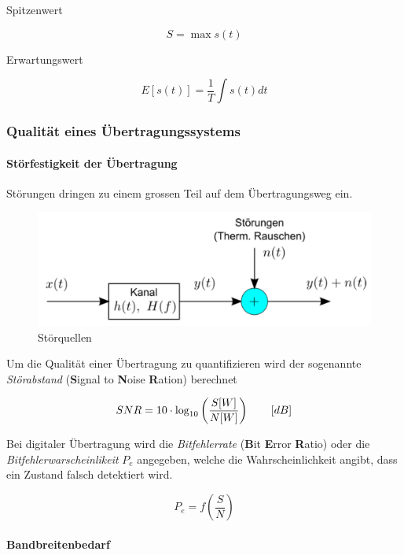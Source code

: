 \documentclass[
  10pt,
  a4paper,
  german]{article}
\let\oldparagraph\paragraph
\renewcommand{\paragraph}[1]{\oldparagraph{#1}\mbox{}}
\numberwithin{equation}{section}
\let\paragraph\oldparagraph
\renewcommand{\paragraph}[1]{\oldparagraph{#1}\mbox{}\par}
\begin{document}
Spitzenwert

\[
S = \max{s(t)}
\]

Erwartungswert

\[
E[s(t)]=\frac{1}{T}\int{s(t)dt}
\]

\hypertarget{qualituxe4t-eines-uxfcbertragungssystems}{%
\subsubsection{Qualität eines
Übertragungssystems}\label{qualituxe4t-eines-uxfcbertragungssystems}}

\hypertarget{stuxf6rfestigkeit-der-uxfcbertragung}{%
\paragraph{Störfestigkeit der
Übertragung}\label{stuxf6rfestigkeit-der-uxfcbertragung}}

Störungen dringen zu einem grossen Teil auf dem Übertragungsweg ein.

\begin{figure}[H]

{\centering \includegraphics{images/01_Stoerungen.png}

}

\caption{Störquellen}

\end{figure}

Um die Qualität einer Übertragung zu quantifizieren wird der sogenannte
\emph{Störabstand} (\textbf{S}ignal to \textbf{N}oise \textbf{R}ation)
berechnet

\[
SNR=10\cdot\log_{10}\left(\frac{S\space[W]}{N\space[W]}\right)\qquad[dB]
\]

Bei digitaler Übertragung wird die \emph{Bitfehlerrate} (\textbf{B}it
\textbf{E}rror \textbf{R}atio) oder die \emph{Bitfehlerwarscheinlikeit}
\(P_e\) angegeben, welche die Wahrscheinlichkeit angibt, dass ein
Zustand falsch detektiert wird.

\[
P_e=f\left(\frac{S}{N}\right)
\]

\hypertarget{bandbreitenbedarf}{%
\paragraph{Bandbreitenbedarf}\label{bandbreitenbedarf}}
\end{document}
